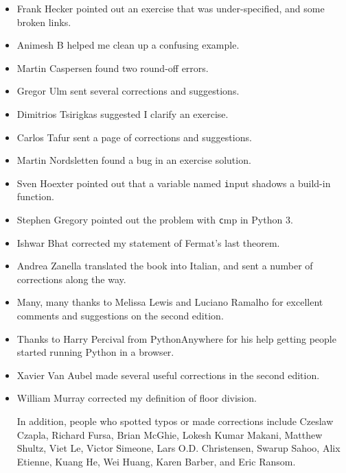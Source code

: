 \documentclass[
DIV=11,
fontsize=12,
twoside,
headinclude=false,
titlepage=firstiscover,
abstract=true,
headsepline=true,
footsepline=true,
chapterprefix=true, %
headings=big,
bibliography=totoc,%
captions=tableheading
]{scrbook}
\theoremstyle{definition}
\begin{document}
\begin{itemize}
\item Frank Hecker pointed out an exercise that was under-specified, and
some broken links.

\item Animesh B helped me clean up a confusing example.

\item Martin Caspersen found two round-off errors.

\item Gregor Ulm sent several corrections and suggestions.

\item Dimitrios Tsirigkas suggested I clarify an exercise.

\item Carlos Tafur sent a page of corrections and suggestions.

\item Martin Nordsletten found a bug in an exercise solution.

\item Sven Hoexter pointed out that a variable named {\texttt input}
shadows a build-in function.

\item Stephen Gregory pointed out the problem with {\texttt cmp}
in Python 3.

\item Ishwar Bhat corrected my statement of Fermat's last theorem.

\item Andrea Zanella translated the book into Italian, and sent a
number of corrections along the way.

\item Many, many thanks to Melissa Lewis and Luciano Ramalho for
  excellent comments and suggestions on the second edition.

\item Thanks to Harry Percival from PythonAnywhere for his help
getting people started running Python in a browser.

\item Xavier Van Aubel made several useful corrections in the second
edition.

\item William Murray corrected my definition of floor division.


In addition, people who spotted typos or made corrections include
Czeslaw Czapla,
Richard Fursa, Brian McGhie, Lokesh Kumar Makani, Matthew Shultz, Viet
Le, Victor Simeone, Lars O.D. Christensen, Swarup Sahoo, Alix Etienne,
Kuang He, Wei Huang, Karen Barber, and Eric Ransom.




\end{itemize}
\end{document}
